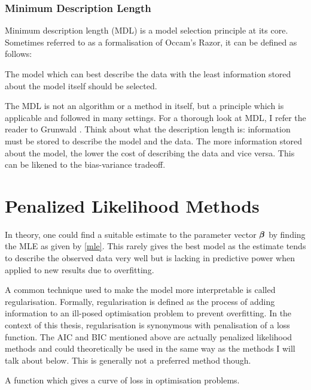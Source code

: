 \subsubsection{Minimum Description Length}\label{sec:mdl}

Minimum description length (MDL) is a model selection principle at its core. Sometimes referred to as a formalisation of Occam's Razor, it can be defined as follows:

\begin{definition}\label{def:mdl}
The model which can best describe the data with the least information stored about the model itself should be selected.
\end{definition}

The MDL is not an algorithm or a method in itself, but a principle which is applicable and followed in many settings. For a thorough look at MDL, I refer the reader to Grunwald . Think about what the description length is: information must be stored to describe the model and the data. The more information stored about the model, the lower the cost of describing the data and vice versa. This can be likened to the bias-variance tradeoff.

\section{Penalized Likelihood Methods}\label{sec:penalized-likelihood-methods}

In theory, one could find a suitable estimate to the parameter vector $\boldsymbol{\beta}$ by finding the MLE as given by \cref{mle}. This rarely gives the best model as the estimate tends to describe the observed data very well but is lacking in predictive power when applied to new results due to overfitting.

A common technique used to make the model more interpretable is called regularisation. Formally, regularisation is defined as the process of adding information to an ill-posed optimisation problem to prevent overfitting. In the context of this thesis, regularisation is synonymous with penalisation of a loss function. The AIC and BIC mentioned above are actually penalized likelihood methods and could theoretically be used in the same way as the methods I will talk about below. This is generally not a preferred method though.

\begin{definition}
A function which gives a curve of loss in optimisation problems.
\end{definition}

